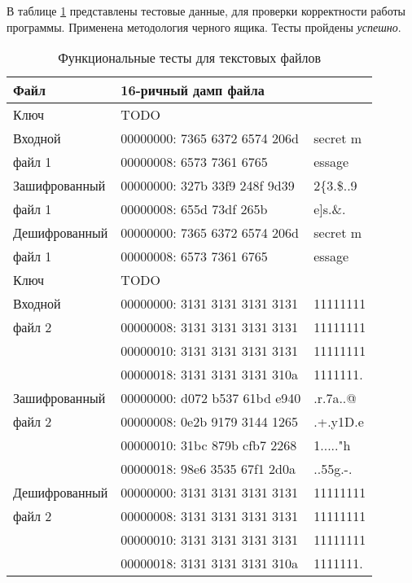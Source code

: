 В таблице \ref{tbl:tests} представлены тестовые данные, для проверки корректности работы программы.
Применена методология черного ящика. Тесты пройдены \textit{успешно}.

\begin{table}[ht!]
	\begin{center}
		\caption{Функциональные тесты для текстовых файлов}
        \label{tbl:tests}
		\begin{tabular}{|l|ll|}
            \hline
            Файл & 16-ричный дамп файла & \\
			\hline
			\hline
            Ключ          & TODO & \\
            \hline
            Входной       & 00000000: 7365 6372 6574 206d & secret m \\
            файл 1        & 00000008: 6573 7361 6765      & essage \\
			\hline
            Зашифрованный & 00000000: 327b 33f9 248f 9d39 & 2\{3.\$..9 \\
            файл 1        & 00000008: 655d 73df 265b      & e]s.\&. \\
            \hline
            Дешифрованный & 00000000: 7365 6372 6574 206d & secret m \\
            файл 1        & 00000008: 6573 7361 6765      & essage \\
			\hline
            \hline
            Ключ          & TODO & \\
            \hline
            Входной       & 00000000: 3131 3131 3131 3131 & 11111111 \\
            файл 2        & 00000008: 3131 3131 3131 3131 & 11111111 \\
                          & 00000010: 3131 3131 3131 3131 & 11111111 \\
                          & 00000018: 3131 3131 3131 310a & 1111111. \\
			\hline
            Зашифрованный & 00000000: d072 b537 61bd e940 & .r.7a..@ \\
            файл 2        & 00000008: 0e2b 9179 3144 1265 & .+.y1D.e \\
                          & 00000010: 31bc 879b cfb7 2268 & 1....."h \\
                          & 00000018: 98e6 3535 67f1 2d0a & ..55g.-. \\
            \hline
            Дешифрованный & 00000000: 3131 3131 3131 3131 & 11111111 \\
            файл 2        & 00000008: 3131 3131 3131 3131 & 11111111 \\
                          & 00000010: 3131 3131 3131 3131 & 11111111 \\
                          & 00000018: 3131 3131 3131 310a & 1111111. \\
            \hline
		\end{tabular}
	\end{center}
\end{table}

